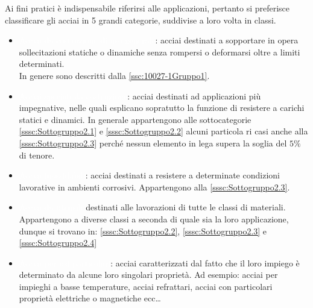 Ai fini pratici è indispensabile riferirsi alle applicazioni, pertanto si preferisce classificare gli acciai in 5 grandi categorie, suddivise a loro volta in classi.
\begin{itemize}
\item \colorbox{UnifeLight}{\textcolor{white}{Acciai da costruzione di uso generale}}: 
	acciai destinati a sopportare in opera sollecitazioni statiche o dinamiche senza rompersi o 
	deformarsi oltre a limiti determinati.\\
	In genere sono descritti dalla \ref{ssc:10027-1Gruppo1}.

\item \colorbox{UnifeLight}{\textcolor{white}{Acciai speciali da costruzione}}: 
	acciai destinati ad applicazioni più impegnative, nelle quali esplicano sopratutto la 
	funzione di resistere a carichi statici e dinamici. In generale appartengono alle 
	sottocategorie \ref{sssc:Sottogruppo2.1} e \ref{sssc:Sottogruppo2.2} alcuni particola
	ri casi anche alla \ref{sssc:Sottogruppo2.3} perché nessun elemento in lega supera la 
	soglia del $5\%$ di tenore.

\item \colorbox{UnifeLight}{\textcolor{white}{Acciai inossidabili}}: 
	acciai destinati a resistere a determinate condizioni lavorative in ambienti corrosivi. 
	Appartengono alla \ref{sssc:Sottogruppo2.3}.

\item \colorbox{UnifeLight}{\textcolor{white}{Acciai da utensili}} 
	destinati alle lavorazioni di tutte le classi di materiali. Appartengono a diverse classi a 
	seconda di quale sia la loro applicazione, dunque si trovano in: \ref{sssc:Sottogruppo2.2}, 
	\ref{sssc:Sottogruppo2.3} e \ref{sssc:Sottogruppo2.4}

\item \colorbox{UnifeLight}{\textcolor{white}{Acciai per usi particolari}}: 
	acciai caratterizzati dal fatto che il loro impiego è determinato da alcune loro singolari 
	proprietà. Ad esempio: acciai per impieghi a basse temperature, acciai refrattari, acciai 
	con particolari proprietà elettriche o magnetiche ecc\dots
\end{itemize}